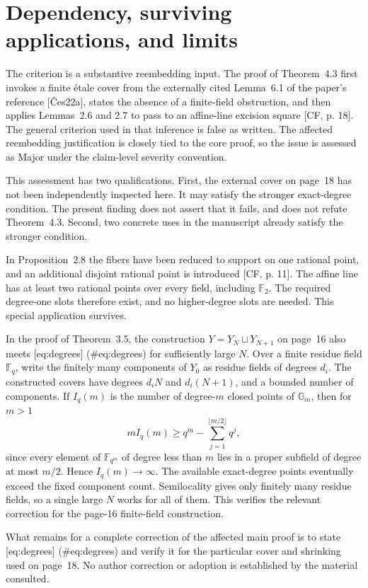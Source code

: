 \documentclass[10pt]{article}
\begin{document}
\section*{Dependency, surviving applications, and limits}
The criterion is a substantive reembedding input. The proof of Theorem 4.3 first invokes a finite étale cover from the externally cited Lemma 6.1 of the paper’s reference [Čes22a], states the absence of a finite-field obstruction, and then applies Lemmas 2.6 and 2.7 to pass to an affine-line excision square [CF, p. 18]. The general criterion used in that inference is false as written. The affected reembedding justification is closely tied to the core proof, so the issue is assessed as Major under the claim-level severity convention.\par
This assessment has two qualifications. First, the external cover on page 18 has not been independently inspected here. It may satisfy the stronger exact-degree condition. The present finding does not assert that it fails, and does not refute Theorem 4.3. Second, two concrete uses in the manuscript already satisfy the stronger condition.\par
In Proposition 2.8 the fibers have been reduced to support on one rational point, and an additional disjoint rational point is introduced [CF, p. 11]. The affine line has at least two rational points over every field, including \(\mathbb F_2\). The required degree-one slots therefore exist, and no higher-degree slots are needed. This special application survives.\par
In the proof of Theorem 3.5, the construction \(Y=Y_N\sqcup Y_{N+1}\) on page 16 also meets [eq:degrees] (\#eq:degrees) for sufficiently large \(N\). Over a finite residue field \(\mathbb F_q\), write the finitely many components of \(Y_0\) as residue fields of degrees \(d_i\). The constructed covers have degrees \(d_iN\) and \(d_i(N+1)\), and a bounded number of components. If \(I_q(m)\) is the number of degree-\(m\) closed points of \(\mathbb G_m\), then for \(m>1\) \[mI_q(m)\ge q^m-\sum_{j=1}^{\lfloor m/2\rfloor}q^j,\] since every element of \(\mathbb F_{q^m}\) of degree less than \(m\) lies in a proper subfield of degree at most \(m/2\). Hence \(I_q(m)\to\infty\). The available exact-degree points eventually exceed the fixed component count. Semilocality gives only finitely many residue fields, so a single large \(N\) works for all of them. This verifies the relevant correction for the page-16 finite-field construction.\par
What remains for a complete correction of the affected main proof is to state [eq:degrees] (\#eq:degrees) and verify it for the particular cover and shrinking used on page 18. No author correction or adoption is established by the material consulted.\par
\end{document}
